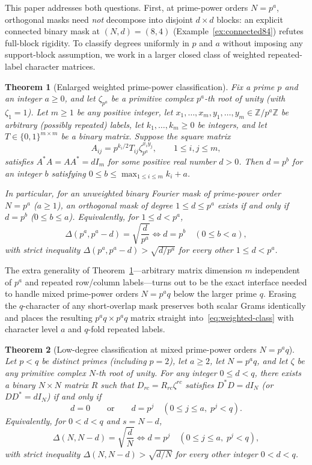 \documentclass[11pt,reqno]{amsart}
\numberwithin{equation}{section}
\newtheorem{theorem}{Theorem}[section]
\theoremstyle{definition}
\theoremstyle{remark}
\newcommand{\Z}{\mathbb{Z}}
\begin{document}
This paper addresses both questions. First, at prime-power orders $N=p^a$, orthogonal masks need \emph{not} decompose into disjoint $d\times d$ blocks: an explicit connected binary mask at $(N,d)=(8,4)$ (Example~\ref{ex:connected84}) refutes full-block rigidity. To classify degrees uniformly in $p$ and $a$ without imposing any support-block assumption, we work in a larger closed class of weighted repeated-label character matrices.

\begin{theorem}[Enlarged weighted prime-power classification]
\label{thm:prime-power}
Fix a prime $p$ and an integer $a\ge 0$, and let $\zeta_{p^a}$ be a primitive complex $p^a$-th root of unity (with $\zeta_1=1$). Let $m\ge 1$ be any positive integer, let $x_1,\ldots,x_m,y_1,\ldots,y_m\in\Z/p^a\Z$ be arbitrary (possibly repeated) labels, let $k_1,\ldots,k_m\ge 0$ be integers, and let $T\in\{0,1\}^{m\times m}$ be a binary matrix. Suppose the square matrix
\begin{equation}
\label{eq:weighted-class}
A_{ij} = p^{k_i/2} T_{ij} \zeta_{p^a}^{x_i y_j},\qquad 1\le i,j\le m,
\end{equation}
satisfies $A^*A = AA^* = dI_m$ for some positive real number $d>0$. Then $d = p^b$ for an integer $b$ satisfying $0\le b\le \max_{1\le i\le m} k_i + a$.

In particular, for an unweighted binary Fourier mask of prime-power order $N=p^a$ ($a\ge 1$), an orthogonal mask of degree $1\le d\le p^a$ exists if and only if $d=p^b$ ($0\le b\le a$). Equivalently, for $1\le d<p^a$,
\[
\Delta(p^a, p^a-d) = \sqrt{\frac{d}{p^a}} \iff d = p^b \quad (0\le b<a),
\]
with strict inequality $\Delta(p^a,p^a-d)>\sqrt{d/p^a}$ for every other $1\le d<p^a$.
\end{theorem}

The extra generality of Theorem~\ref{thm:prime-power}---arbitrary matrix dimension $m$ independent of $p^a$ and repeated row/column labels---turns out to be the exact interface needed to handle mixed prime-power orders $N=p^a q$ below the larger prime $q$. Erasing the $q$-character of any short-overlap mask preserves both scalar Grams identically and places the resulting $p^a q\times p^a q$ matrix straight into~\eqref{eq:weighted-class} with character level $a$ and $q$-fold repeated labels.

\begin{theorem}[Low-degree classification at mixed prime-power orders $N=p^a q$]
\label{thm:mixed-low}
Let $p<q$ be distinct primes (including $p=2$), let $a\ge 2$, let $N=p^a q$, and let $\zeta$ be any primitive complex $N$-th root of unity. For any integer $0\le d<q$, there exists a binary $N\times N$ matrix $R$ such that $D_{rc}=R_{rc}\zeta^{rc}$ satisfies $D^*D=dI_N$ (or $DD^*=dI_N$) if and only if
\begin{equation}
\label{eq:mixed-deg}
d = 0 \qquad\text{or}\qquad d = p^j \quad (0\le j\le a,\; p^j < q).
\end{equation}
Equivalently, for $0<d<q$ and $s=N-d$,
\[
\Delta(N, N-d) = \sqrt{\frac{d}{N}} \iff d = p^j \quad (0\le j\le a,\; p^j < q),
\]
with strict inequality $\Delta(N,N-d)>\sqrt{d/N}$ for every other integer $0<d<q$.
\end{theorem}
\end{document}
